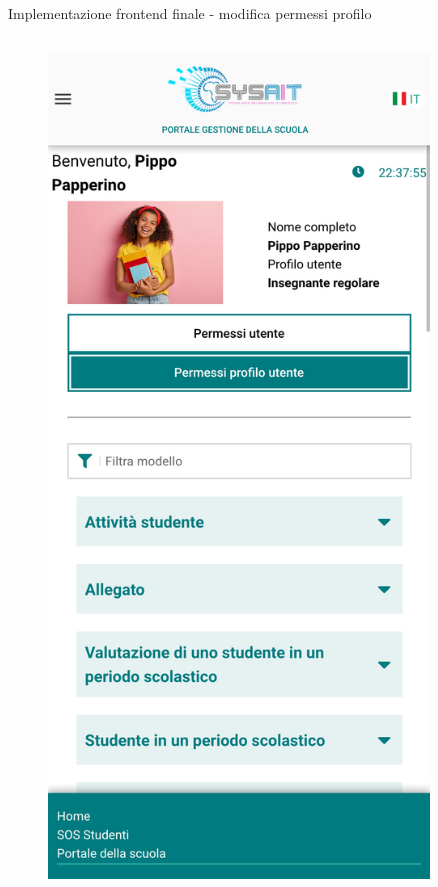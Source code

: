 \documentclass[aspectratio=169]{beamer}
\begin{document}
\begin{frame}[fragile]{Implementazione frontend finale - modifica permessi profilo}
\begin{columns}[T]
\begin{column}{0.2\textwidth}
\begin{figure}
				\includegraphics[width=0.9\textwidth]{../images/permission-management-mobile-profile.png}
			\end{figure}
		\end{column}
	\end{columns}
\end{frame}
\end{document}
